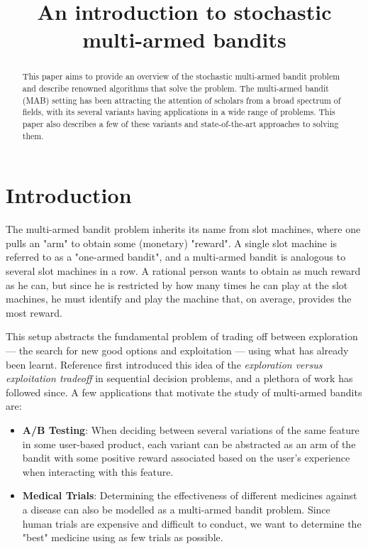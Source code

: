 \documentclass[conference]{IEEEtran}
\begin{document}
\title{An introduction to stochastic multi-armed bandits}

\author{
}

\maketitle

\begin{abstract}
This paper aims to provide an overview of the stochastic multi-armed bandit problem and describe renowned algorithms that solve the problem. The multi-armed bandit (MAB) setting has been attracting the attention of scholars from a broad spectrum of fields, with its several variants having applications in a wide range of problems. This paper also describes a few of these variants and state-of-the-art approaches to solving them.
\end{abstract}

\section{Introduction}
The multi-armed bandit problem inherits its name from slot machines, where one pulls an "arm" to obtain some (monetary) "reward". A single slot machine is referred to as a "one-armed bandit", and a multi-armed bandit is analogous to several slot machines in a row. A rational person wants to obtain as much reward as he can, but since he is restricted by how many times he can play at the slot machines, he must identify and play the machine that, on average, provides the most reward.

This setup abstracts the fundamental problem of trading off between exploration — the search for new good options and exploitation — using what has already been learnt. Reference \cite{bandit_intro} first introduced this idea of the \textit{exploration versus exploitation tradeoff} in sequential decision problems, and a plethora of work has followed since. A few applications that motivate the study of multi-armed bandits are: 
\begin{itemize}
    \item \textbf{A/B Testing}\cite{ab_testing}: When deciding between several variations of the same feature in some user-based product, each variant can be abstracted as an arm of the bandit with some positive reward associated based on the user's experience when interacting with this feature.
    \item \textbf{Medical Trials}\cite{medical_testing}: Determining the effectiveness of different medicines against a disease can also be modelled as a multi-armed bandit problem. Since human trials are expensive and difficult to conduct, we want to determine the "best" medicine using as few trials as possible.
\end{itemize}
\end{document}

